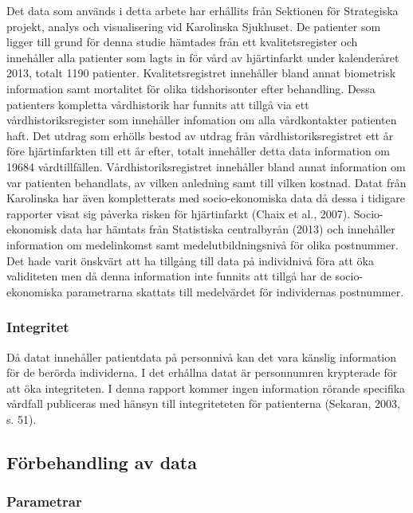 Det data som används i detta arbete har erhållits från Sektionen för Strategiska projekt, analys och visualisering vid Karolinska Sjukhuset. De patienter som ligger till grund för denna studie hämtades från ett kvalitetsregister och innehåller alla patienter som lagts in för vård av hjärtinfarkt under kalenderåret 2013, totalt 1190 patienter. Kvalitetsregistret innehåller bland annat biometrisk information samt mortalitet för olika tidshorisonter efter behandling. Dessa patienters kompletta vårdhistorik har funnits att tillgå via ett vårdhistoriksregister som innehåller infomation om alla vårdkontakter patienten haft. Det utdrag som erhölls bestod av utdrag från vårdhistoriksregistret ett år före hjärtinfarkten till ett år efter, totalt innehåller detta data information om 19684 vårdtillfällen. Vårdhistoriksregistret innehåller bland annat information om var patienten behandlats, av vilken anledning samt till vilken kostnad. Datat från Karolinska har även kompletterats med socio-ekonomiska data då dessa i tidigare rapporter visat sig påverka risken för hjärtinfarkt (Chaix et al., 2007). Socio-ekonomisk data har hämtats från Statistiska centralbyrån (2013) och innehåller information om medelinkomst samt medelutbildningsnivå för olika postnummer. Det hade varit önskvärt att ha tillgång till data på individnivå föra att öka validiteten men då denna information inte funnits att tillgå har de socio-ekonomiska parametrarna skattats till medelvärdet för individernas postnummer.

\subsubsection{Integritet}

Då datat innehåller patientdata på personnivå kan det vara känslig information för de berörda individerna. I det erhållna datat är personnumren krypterade för att öka integriteten. I denna rapport kommer ingen information rörande specifika vårdfall publiceras med hänsyn till integriteteten för patienterna (Sekaran, 2003, s. 51).

\subsection{Förbehandling av data}

\subsubsection{Parametrar}

